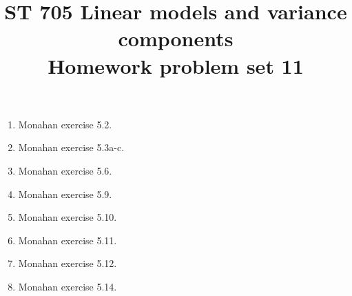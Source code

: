 \documentclass[11pt]{article}
\title{ST 705 Linear models and variance components \\ 
        Homework problem set 11}
\begin{document}
\maketitle

\begin{enumerate}

\item Monahan exercise 5.2.

\item Monahan exercise 5.3a-c.

\item Monahan exercise 5.6.

\item Monahan exercise 5.9.

\item Monahan exercise 5.10.

\item Monahan exercise 5.11.

\item Monahan exercise 5.12.

\item Monahan exercise 5.14.

\end{enumerate}
\end{document}
